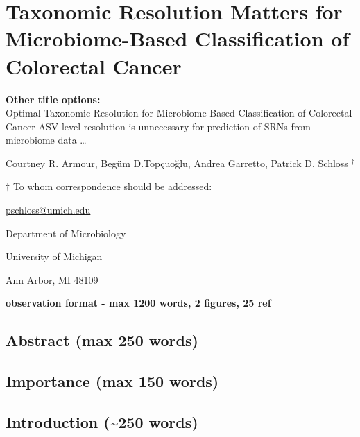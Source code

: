 \documentclass[
]{article}
\author{}
\date{\vspace{-2.5em}}
\begin{document}
\hypertarget{taxonomic-resolution-matters-for-microbiome-based-classification-of-colorectal-cancer}{%
\section{Taxonomic Resolution Matters for Microbiome-Based
Classification of Colorectal
Cancer}\label{taxonomic-resolution-matters-for-microbiome-based-classification-of-colorectal-cancer}}

\vspace{10mm}

\textbf{Other title options:}\\
Optimal Taxonomic Resolution for Microbiome-Based Classification of
Colorectal Cancer ASV level resolution is unnecessary for prediction of
SRNs from microbiome data \ldots{}

\vspace{10mm}

Courtney R. Armour, Begüm D.Topçuoğlu, Andrea Garretto, Patrick D.
Schloss \({^\dagger}\)

\vspace{20mm}

\({\dagger}\) To whom correspondence should be addressed:

\href{mailto:pschloss@umich.edu}{pschloss@umich.edu}

Department of Microbiology

University of Michigan

Ann Arbor, MI 48109

\vspace{20mm}

\textbf{observation format - max 1200 words, 2 figures, 25 ref}

\newpage

\hypertarget{abstract-max-250-words}{%
\subsection{Abstract (max 250 words)}\label{abstract-max-250-words}}

\hypertarget{importance-max-150-words}{%
\subsection{Importance (max 150 words)}\label{importance-max-150-words}}

\newpage

\hypertarget{introduction-250-words}{%
\subsection{Introduction (\textasciitilde250
words)}\label{introduction-250-words}}
\end{document}
